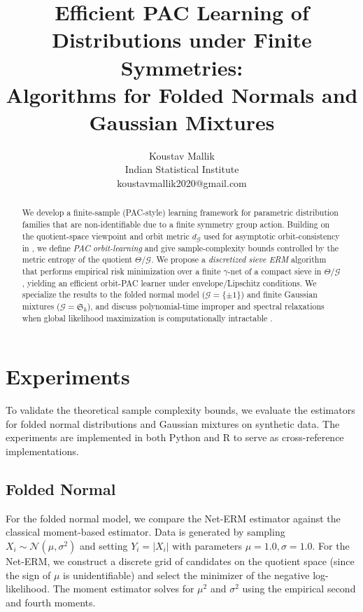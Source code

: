 \documentclass{article}
\theoremstyle{plain}
\theoremstyle{definition}
\theoremstyle{remark}
\newcommand{\G}{\mathcal{G}}
\newcommand{\Th}{\Theta}
\newcommand{\quot}{\Th/\G}
\newcommand{\dG}{d_{\G}}
\numberwithin{equation}{section}
\begin{document}
\title{Efficient PAC Learning of Distributions under Finite Symmetries:\\
Algorithms for Folded Normals and Gaussian Mixtures}

\author{Koustav Mallik\\
Indian Statistical Institute\\
koustavmallik2020@gmail.com}

\maketitle

\begin{abstract}
We develop a finite-sample (PAC-style) learning framework for parametric distribution families
that are non-identifiable due to a finite symmetry group action.
Building on the quotient-space viewpoint and orbit metric \(\dG\) used for asymptotic orbit-consistency
in \cite{MallikOrbitHausdorffArxiv}, we define \emph{PAC orbit-learning} and give sample-complexity bounds
controlled by the metric entropy of the quotient \(\quot\).
We propose a \emph{discretized sieve ERM} algorithm that performs empirical risk minimization over
a finite \(\gamma\)-net of a compact sieve in \(\quot\), yielding an efficient orbit-PAC learner under
envelope/Lipschitz conditions. We specialize the results to the folded normal model
(\(\G=\{\pm 1\}\)) and finite Gaussian mixtures (\(\G=\mathfrak{S}_k\)), and discuss polynomial-time
improper and spectral relaxations when global likelihood maximization is computationally intractable
\cite{ToshDasgupta2018,AroraKannan2001,FeldmanServedioODonnell2006,MoitraValiant2010}.
\end{abstract}

\section{Experiments}
\label{sec:experiments}

To validate the theoretical sample complexity bounds, we evaluate the estimators for folded normal distributions and Gaussian mixtures on synthetic data. The experiments are implemented in both Python and R to serve as cross-reference implementations.

\subsection{Folded Normal}
For the folded normal model, we compare the Net-ERM estimator against the classical moment-based estimator.
Data is generated by sampling $X_i \sim \mathcal{N}(\mu, \sigma^2)$ and setting $Y_i = |X_i|$ with parameters $\mu = 1.0, \sigma = 1.0$.
For the Net-ERM, we construct a discrete grid of candidates on the quotient space (since the sign of $\mu$ is unidentifiable) and select the minimizer of the negative log-likelihood.
The moment estimator solves for $\mu^2$ and $\sigma^2$ using the empirical second and fourth moments.
\end{document}
